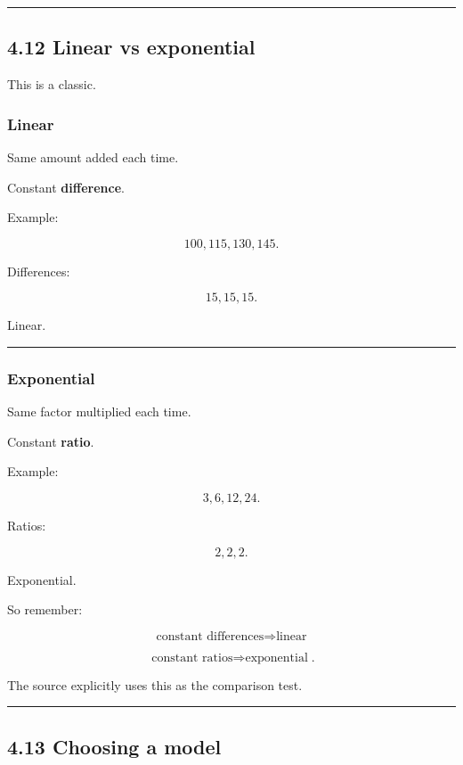 \documentclass[
]{article}
\begin{document}
\begin{center}\rule{0.5\linewidth}{0.5pt}\end{center}

\subsection{4.12 Linear vs exponential}\label{linear-vs-exponential}

This is a classic.

\subsubsection{Linear}\label{linear}

Same amount added each time.

Constant \textbf{difference}.

Example:

\[
100,115,130,145.
\]

Differences:

\[
15,15,15.
\]

Linear.

\begin{center}\rule{0.5\linewidth}{0.5pt}\end{center}

\subsubsection{Exponential}\label{exponential}

Same factor multiplied each time.

Constant \textbf{ratio}.

Example:

\[
3,6,12,24.
\]

Ratios:

\[
2,2,2.
\]

Exponential.

So remember:

\[
\boxed{\text{constant differences}\Rightarrow\text{linear}}
\]

\[
\boxed{\text{constant ratios}\Rightarrow\text{exponential}}.
\]

The source explicitly uses this as the comparison test.

\begin{center}\rule{0.5\linewidth}{0.5pt}\end{center}

\subsection{4.13 Choosing a model}\label{choosing-a-model}
\end{document}
